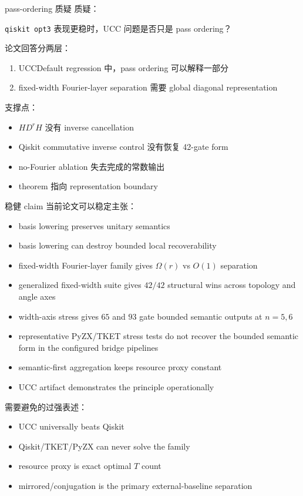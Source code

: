 \documentclass[aspectratio=169,11pt]{ctexbeamer}
\begin{document}
\begin{frame}{pass-ordering 质疑}
  质疑：
  \begin{center}
    \texttt{qiskit opt3} 表现更稳时，UCC 问题是否只是 pass ordering？
  \end{center}

  论文回答分两层：

  \begin{enumerate}
    \item UCCDefault regression 中，pass ordering 可以解释一部分
    \item fixed-width Fourier-layer separation 需要 global diagonal representation
  \end{enumerate}

  支撑点：
  \begin{itemize}
    \item $H D^r H$ 没有 inverse cancellation
    \item Qiskit commutative inverse control 没有恢复 42-gate form
    \item no-Fourier ablation 失去完成的常数输出
    \item theorem 指向 representation boundary
  \end{itemize}
\end{frame}

\begin{frame}{稳健 claim}
  当前论文可以稳定主张：

  \begin{itemize}
    \item basis lowering preserves unitary semantics
    \item basis lowering can destroy bounded local recoverability
    \item fixed-width Fourier-layer family gives $\Omega(r)$ vs $O(1)$ separation
    \item generalized fixed-width suite gives $42/42$ structural wins across topology and angle axes
    \item width-axis stress gives $65$ and $93$ gate bounded semantic outputs at $n=5,6$
    \item representative PyZX/TKET stress tests do not recover the bounded semantic form in the configured bridge pipelines
    \item semantic-first aggregation keeps resource proxy constant
    \item UCC artifact demonstrates the principle operationally
  \end{itemize}

  需要避免的过强表述：

  \begin{itemize}
    \item UCC universally beats Qiskit
    \item Qiskit/TKET/PyZX can never solve the family
    \item resource proxy is exact optimal $T$ count
    \item mirrored/conjugation is the primary external-baseline separation
  \end{itemize}
\end{frame}
\end{document}
